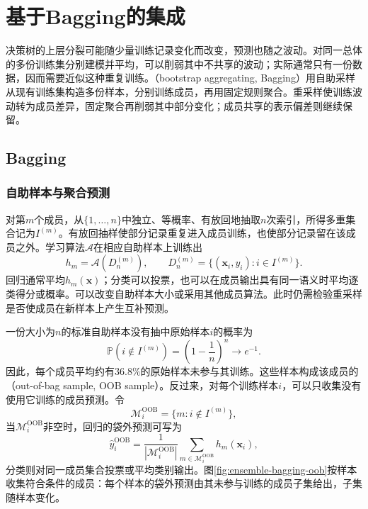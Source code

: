 \section{基于Bagging的集成}
\label{sec:ensemble-bagging}

决策树的上层分裂可能随少量训练记录变化而改变，预测也随之波动。对同一总体的多份训练集分别建模并平均，可以削弱其中不共享的波动；实际通常只有一份数据，因而需要近似这种重复训练。（bootstrap aggregating, Bagging）用自助采样从现有训练集构造多份样本，分别训练成员，再用固定规则聚合。重采样使训练波动转为成员差异，固定聚合再削弱其中部分变化；成员共享的表示偏差则继续保留。

\subsection{Bagging}
\label{sec:ensemble-bagging-bootstrap}

\subsubsection{自助样本与聚合预测}

对第$m$个成员，从$\{1,\ldots,n\}$中独立、等概率、有放回地抽取$n$次索引，所得多重集合记为$I^{(m)}$。有放回抽样使部分记录重复进入成员训练，也使部分记录留在该成员之外。学习算法$\mathcal{A}$在相应自助样本上训练出
\[
  h_m=\mathcal{A}\!\left(D_n^{(m)}\right),
  \qquad
  D_n^{(m)}=\{(\bm{x}_i,y_i):i\in I^{(m)}\}.
\]
回归通常平均$h_m(\bm{x})$；分类可以投票，也可以在成员输出具有同一语义时平均逐类得分或概率。可以改变自助样本大小或采用其他成员算法。此时仍需检验重采样是否使成员在新样本上产生互补预测。

一份大小为$n$的标准自助样本没有抽中原始样本$i$的概率为
\begin{equation}
  \mathbb{P}\!\left(i\notin I^{(m)}\right)
  =
  \left(1-\frac{1}{n}\right)^n
  \longrightarrow e^{-1}.
  \label{eq:ensemble-oob-probability}
\end{equation}
因此，每个成员平均约有$36.8\%$的原始样本未参与其训练。这些样本构成该成员的（out-of-bag sample, OOB sample）。反过来，对每个训练样本$i$，可以只收集没有使用它训练的成员预测。令
\[
  \mathcal{M}_{i}^{\mathrm{OOB}}
  =\{m:i\notin I^{(m)}\},
\]
当$\mathcal{M}_{i}^{\mathrm{OOB}}$非空时，回归的袋外预测可写为
\begin{equation}
  \widehat{y}_{i}^{\mathrm{OOB}}
  =
  \frac{1}{|\mathcal{M}_{i}^{\mathrm{OOB}}|}
  \sum_{m\in\mathcal{M}_{i}^{\mathrm{OOB}}}h_m(\bm{x}_i),
  \label{eq:ensemble-oob-prediction}
\end{equation}
分类则对同一成员集合投票或平均类别输出。图\ref{fig:ensemble-bagging-oob}按样本收集符合条件的成员：每个样本的袋外预测由其未参与训练的成员子集给出，子集随样本变化。

